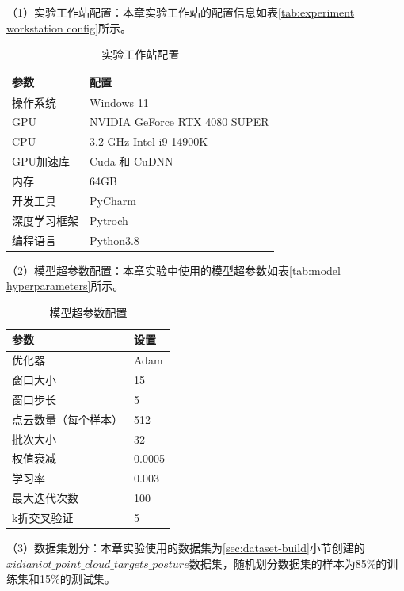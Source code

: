 （1）实验工作站配置：本章实验工作站的配置信息如表\eqref{tab:experiment workstation config}所示。
\begin{table}[htbp]
    \centering
    \caption{实验工作站配置}
    \begin{tabular}{ll}
        \toprule
        \textbf{参数} & \textbf{配置} \\
        \midrule
        操作系统 & Windows 11 \\
        GPU & NVIDIA GeForce RTX 4080 SUPER \\
        CPU & 3.2 GHz Intel i9-14900K \\
        GPU加速库 & Cuda 和 CuDNN \\
        内存 & 64GB \\
        开发工具 & PyCharm \\
        深度学习框架 & Pytroch \\
        编程语言 & Python3.8 \\
        \bottomrule
    \end{tabular}
    \label{tab:experiment workstation config}
\end{table}

（2）模型超参数配置：本章实验中使用的模型超参数如表\eqref{tab:model hyperparameters}所示。
\begin{table}[htbp]
    \centering
    \caption{模型超参数配置}
    \begin{tabular}{ll}
        \toprule
        \textbf{参数} & \textbf{设置} \\
        \midrule
        优化器 & Adam \\
        窗口大小 & 15 \\
        窗口步长 & 5 \\
        点云数量（每个样本） & 512 \\
        批次大小 & 32 \\
        权值衰减 & 0.0005 \\
        学习率 & 0.003 \\
        最大迭代次数 & 100 \\
        k折交叉验证 & 5 \\
        \bottomrule
    \end{tabular}
    \label{tab:model hyperparameters}
\end{table}

（3）数据集划分：本章实验使用的数据集为\eqref{sec:dataset-build}小节创建的$xidianiot\_point\_cloud\_targets\_posture$数据集，随机划分数据集的样本为85\%的训练集和15\%的测试集。




